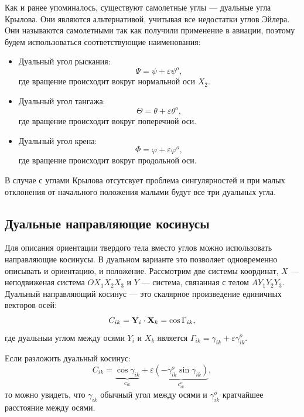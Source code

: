 Как и ранее упоминалось, существуют самолетные углы --- дуальные угла Крылова. Они являются альтернативой, учитывая все недостатки углов Эйлера. Они называются самолетными так как получили применение в авиации, поэтому будем использоваться соответствующие наименования:
\begin{itemize}
    \item Дуальный угол рыскания:
        \begin{equation*}
            \Psi = \psi + \varepsilon \psi^o,
        \end{equation*}
        где вращение происходит вокруг нормальной оси $X_2$.
    \item Дуальный угол тангажа:
        \begin{equation*}
            \Theta = \theta + \varepsilon \theta^o,
        \end{equation*}
        где вращение происходит вокруг поперечной оси.
    \item Дуальный угол крена:
        \begin{equation*}
            \Phi = \varphi + \varepsilon \varphi^o,
        \end{equation*}
        где вращение происходит вокруг продольной оси.
\end{itemize}

В случае с углами Крылова отсутсвует проблема сингулярностей и при малых отклонения от начального положения малыми будут все три дуальных угла.

\subsection{Дуальные направляющие косинусы}

Для описания ориентации твердого тела вместо углов можно использовать направляющие косинусы. В дуальном варианте это позволяет одновременно описывать и ориентацию, и положение. Рассмотрим две системы координат, $X$ --- неподвиженая система $O X_1 X_2 X_3$ и $Y$ --- система, связанная с телом $A Y_1 Y_2 Y_3$.
Дуальный направляющий косинус --- это скалярное произведение единичных векторов осей:
\begin{equation*}
    C_{ik} = \vb{Y}_i \cdot \vb{X}_k = \cos \Gamma_{ik},
\end{equation*}
где дуальныи углом между осями $Y_i$ и $X_k$ является $\Gamma_{ik} = \gamma_{ik} + \varepsilon \gamma_{ik}^o$.

Если разложить дуальный косинус:
\begin{equation*}
    C_{ik} = \underbrace{\cos \gamma_{ik}}_{c_{ik}} + \varepsilon \underbrace{(-\gamma_{ik}^o \sin \gamma_{ik})}_{c_{ik}^o},
\end{equation*}
то можно увидеть, что $\gamma_{ik}$ обычный угол между осями и $\gamma_{ik}^o$ кратчайшее расстояние между осями.

